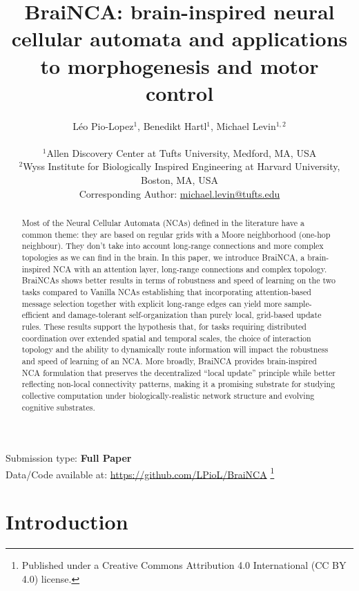 \documentclass[letterpaper]{article}
\title{BraiNCA: brain-inspired neural cellular automata and applications to morphogenesis and motor control}
\author{
    Léo Pio-Lopez$^{1}$,
    Benedikt Hartl$^{1}$,
    Michael Levin$^{1, 2}$ \\
    \mbox{}\\
    $^1$Allen Discovery Center at Tufts University, Medford, MA, USA \\
    $^2$Wyss Institute for Biologically Inspired Engineering at Harvard University, Boston, MA, USA\\
    Corresponding Author: \href{mailto:michael.levin@tufts.edu}{michael.levin@tufts.edu}
} %
\newcommand\blfootnote[1]{%
  \begingroup
  \renewcommand\thefootnote{}\footnote{#1}%
  \addtocounter{footnote}{-1}%
  \endgroup
}
\begin{document}
\maketitle

\begin{abstract}
Most of the Neural Cellular Automata (NCAs) defined in the literature have a common theme: they are based on regular grids with a Moore neighborhood (one-hop neighbour). They don't take into account long-range connections and more complex topologies as we can find in the brain. In this paper, we introduce BraiNCA, a brain-inspired NCA with an attention layer, long-range connections and complex topology. BraiNCAs shows better results in terms of robustness and speed of learning on the two tasks compared to Vanilla NCAs establishing that incorporating attention-based message selection together with explicit long-range edges can yield more sample-efficient and damage-tolerant self-organization than purely local, grid-based update rules. These results support the hypothesis that, for tasks requiring distributed coordination over extended spatial and temporal scales, the choice of interaction topology and the ability to dynamically route information will impact the robustness and speed of learning of an NCA. More broadly, BraiNCA provides brain-inspired NCA formulation that preserves the decentralized “local update” principle while better reflecting non-local connectivity patterns, making it a promising substrate for studying collective computation under biologically-realistic network structure and evolving cognitive substrates.
\end{abstract}


Submission type: \textbf{Full Paper}\\

Data/Code available at: \url{https://github.com/LPioL/BraiNCA}
\blfootnote{\textcopyright Published under a Creative Commons Attribution 4.0 International (CC BY 4.0) license.}

\section{Introduction}
\end{document}
